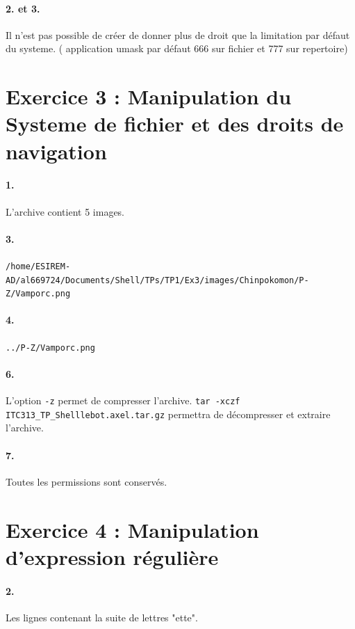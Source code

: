 \paragraph{2. et 3.}
Il n'est pas possible de créer de donner plus de droit que la limitation par défaut du systeme.
( application umask par défaut 666 sur fichier et 777 sur repertoire)

\section{Exercice 3 : Manipulation du Systeme de fichier et des droits de navigation}

\paragraph{1.}
L'archive contient 5 images.

\paragraph{3.}
\texttt{/home/ESIREM-AD/al669724/Documents/Shell/TPs/TP1/Ex3/images/Chinpokomon/P-Z/Vamporc.png}

\paragraph{4.}
\texttt{../P-Z/Vamporc.png}

\paragraph{6.}
L'option \texttt{-z} permet de compresser l'archive.
\texttt{tar -xczf ITC313_TP_Shelllebot.axel.tar.gz}
permettra de décompresser et extraire l'archive.

\paragraph{7.}
Toutes les permissions sont conservés.

\section{Exercice 4 : Manipulation d'expression régulière}

\paragraph{2.}
Les lignes contenant la suite de lettres "ette".


